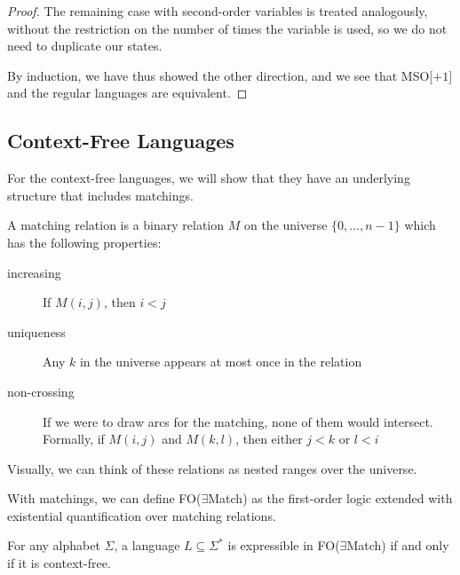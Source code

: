 \begin{proof}
    The remaining case with second-order variables is treated analogously, without the restriction on the number of times the variable is used, so we do not need to duplicate our states.

    By induction, we have thus showed the other direction, and we see that \acs{MSO}[$+ 1$] and the regular languages are equivalent.
\end{proof}

\subsection{Context-Free Languages}\label{subsec:des-context-free-languages}

For the context-free languages, we will show that they have an underlying structure that includes matchings.

A matching relation is a binary relation $M$ on the universe $\{0, \dots, n - 1\}$ which has the following properties:
\begin{description}
    \item[increasing] If $M(i, j)$, then $i < j$
    \item[uniqueness] Any $k$ in the universe appears at most once in the relation
    \item[non-crossing] If we were to draw arcs for the matching, none of them would intersect.
    Formally, if $M(i, j)$ and $M(k, l)$, then either $j < k$ or $l < i$
\end{description}
Visually, we can think of these relations as nested ranges over the universe.

With matchings, we can define \acs{FO}($\exists$Match) as the first-order logic extended with existential quantification over matching relations.

\begin{theorem}
    For any alphabet $\Sigma$, a language $L \subseteq \Sigma^{*}$ is expressible in \acs{FO}($\exists$Match) if and only if it is context-free.
\end{theorem}

